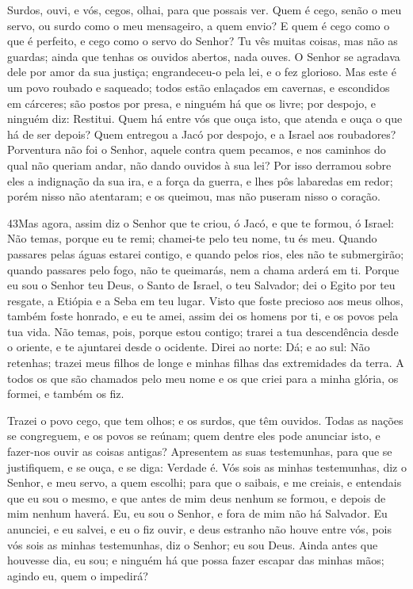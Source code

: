 Surdos, ouvi, e vós, cegos, olhai, para que possais ver.
Quem é cego, senão o meu servo, ou surdo como o meu
mensageiro, a quem envio? E quem é cego como o que é perfeito, e
cego como o servo do Senhor? Tu vês muitas coisas, mas não as
guardas; ainda que tenhas os ouvidos abertos, nada ouves. O
Senhor se agradava dele por amor da sua justiça; engrandeceu-o pela
lei, e o fez glorioso. Mas este é um povo roubado e saqueado;
todos estão enlaçados em cavernas, e escondidos em cárceres; são
postos por presa, e ninguém há que os livre; por despojo, e ninguém
diz: Restitui. Quem há entre vós que ouça isto, que atenda e
ouça o que há de ser depois? Quem entregou a Jacó por
despojo, e a Israel aos roubadores? Porventura não foi o Senhor,
aquele contra quem pecamos, e nos caminhos do qual não queriam
andar, não dando ouvidos à sua lei? Por isso derramou sobre
eles a indignação da sua ira, e a força da guerra, e lhes pôs
labaredas em redor; porém nisso não atentaram; e os queimou, mas não
puseram nisso o coração.

\medskip

\lettrine{43}{}Mas agora, assim diz o Senhor que te criou, ó
Jacó, e que te formou, ó Israel: Não temas, porque eu te remi;
chamei-te pelo teu nome, tu és meu. Quando passares pelas águas
estarei contigo, e quando pelos rios, eles não te submergirão;
quando passares pelo fogo, não te queimarás, nem a chama arderá em
ti. Porque eu sou o Senhor teu Deus, o Santo de Israel, o teu
Salvador; dei o Egito por teu resgate, a Etiópia e a Seba em teu
lugar. Visto que foste precioso aos meus olhos, também foste
honrado, e eu te amei, assim dei os homens por ti, e os povos pela
tua vida. Não temas, pois, porque estou contigo; trarei a tua
descendência desde o oriente, e te ajuntarei desde o ocidente.
Direi ao norte: Dá; e ao sul: Não retenhas; trazei meus filhos
de longe e minhas filhas das extremidades da terra. A todos os
que são chamados pelo meu nome e os que criei para a minha glória,
os formei, e também os fiz.

Trazei o povo cego, que tem olhos; e os surdos, que têm ouvidos.
Todas as nações se congreguem, e os povos se reúnam; quem dentre
eles pode anunciar isto, e fazer-nos ouvir as coisas antigas?
Apresentem as suas testemunhas, para que se justifiquem, e se ouça,
e se diga: Verdade é. Vós sois as minhas testemunhas, diz o
Senhor, e meu servo, a quem escolhi; para que o saibais, e me
creiais, e entendais que eu sou o mesmo, e que antes de mim deus
nenhum se formou, e depois de mim nenhum haverá. Eu, eu sou o
Senhor, e fora de mim não há Salvador. Eu anunciei, e eu
salvei, e eu o fiz ouvir, e deus estranho não houve entre vós, pois
vós sois as minhas testemunhas, diz o Senhor; eu sou Deus.
Ainda antes que houvesse dia, eu sou; e ninguém há que possa
fazer escapar das minhas mãos; agindo eu, quem o impedirá?

